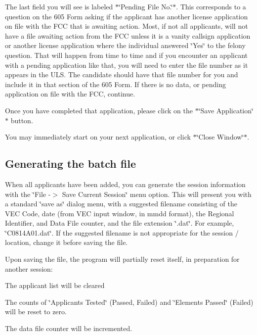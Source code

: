 \begin{DoxyItemize}
\item The last field you will see is labeled $\ast$\char`\"{}\+Pending File No.\char`\"{}$\ast$. This corresponds to a question on the 605 Form asking if the applicant has another license application on file with the F\+CC that is awaiting action. Most, if not all applicants, will not have a file awaiting action from the F\+CC unless it is a vanity callsign application or another license application where the individual answered \char`\"{}\+Yes\char`\"{} to the felony question. That will happen from time to time and if you encounter an applicant with a pending application like that, you will need to enter the file number as it appears in the U\+LS. The candidate should have that file number for you and include it in that section of the 605 Form. If there is no data, or pending application on file with the F\+CC, continue.
\item Once you have completed that application, please click on the $\ast$\char`\"{}\+Save Application\char`\"{}$\ast$ button.
\item You may immediately start on your next application, or click $\ast$\char`\"{}\+Close Window\char`\"{}$\ast$.
\end{DoxyItemize}

\subsection*{Generating the batch file}

When all applicants have been added, you can generate the session information with the \char`\"{}\+File -\/$>$ Save Current Session\char`\"{} menu option. This will present you with a standard \char`\"{}save as\char`\"{} dialog menu, with a suggested filename consisting of the V\+EC Code, date (from V\+EC input window, in mmdd format), the Regional Identifier, and Data File counter, and the file extension \char`\"{}.\+dat\char`\"{}. For example, \char`\"{}\+C0814\+A01.\+dat\char`\"{}. If the suggested filename is not appropriate for the session / location, change it before saving the file.

Upon saving the file, the program will partially reset itself, in preparation for another session\+:


\begin{DoxyItemize}
\item The applicant list will be cleared
\item The counts of \char`\"{}\+Applicants Tested\char`\"{} (Passed, Failed) and \char`\"{}\+Elements
    Passed\char`\"{} (Failed) will be reset to zero.
\item The data file counter will be incremented.
\end{DoxyItemize}

